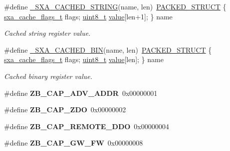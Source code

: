 \begin{DoxyCompactItemize}
\item 
\#define \hyperlink{group___s_x_a_ga43c6a2c7e1b5ee83edc039a248412580}{\+\_\+\+S\+X\+A\+\_\+\+C\+A\+C\+H\+E\+D\+\_\+\+S\+T\+R\+I\+NG}(name,  len)~\hyperlink{group___s_x_a_ga4233297bd31be5c273d4fb0758cc54d7}{P\+A\+C\+K\+E\+D\+\_\+\+S\+T\+R\+U\+CT} \{ \hyperlink{group___s_x_a_ga21b45e50d83fcc1363c4239313e88c06}{sxa\+\_\+cache\+\_\+flags\+\_\+t} flags; \hyperlink{group__hal__dos_gae1affc9ca37cfb624959c866a73f83c2}{uint8\+\_\+t} \hyperlink{group__zcl_ga1ed5b151a90f7e99af8cca2e6875ddf4}{value}\mbox{[}len+1\mbox{]}; \} name
\begin{DoxyCompactList}\small\item\em Cached string register value. \end{DoxyCompactList}\item 
\#define \hyperlink{group___s_x_a_gaa0c4e5507161ec6f607d737e4d949a0b}{\+\_\+\+S\+X\+A\+\_\+\+C\+A\+C\+H\+E\+D\+\_\+\+B\+IN}(name,  len)~\hyperlink{group___s_x_a_ga4233297bd31be5c273d4fb0758cc54d7}{P\+A\+C\+K\+E\+D\+\_\+\+S\+T\+R\+U\+CT} \{ \hyperlink{group___s_x_a_ga21b45e50d83fcc1363c4239313e88c06}{sxa\+\_\+cache\+\_\+flags\+\_\+t} flags; \hyperlink{group__hal__dos_gae1affc9ca37cfb624959c866a73f83c2}{uint8\+\_\+t} \hyperlink{group__zcl_ga1ed5b151a90f7e99af8cca2e6875ddf4}{value}\mbox{[}len\mbox{]}; \} name
\begin{DoxyCompactList}\small\item\em Cached binary register value. \end{DoxyCompactList}\item 
\mbox{\label{group___s_x_a_gaa7956981f26959da78a1394c2ad65c4d}} 
\#define {\bfseries Z\+B\+\_\+\+C\+A\+P\+\_\+\+A\+D\+V\+\_\+\+A\+D\+DR}~0x00000001
\item 
\mbox{\label{group___s_x_a_gaa2470002554608a36463a2f19ddf96f4}} 
\#define {\bfseries Z\+B\+\_\+\+C\+A\+P\+\_\+\+Z\+DO}~0x00000002
\item 
\mbox{\label{group___s_x_a_ga2c7a5cf548a644f0ffb85e45138f60f3}} 
\#define {\bfseries Z\+B\+\_\+\+C\+A\+P\+\_\+\+R\+E\+M\+O\+T\+E\+\_\+\+D\+DO}~0x00000004
\item 
\mbox{\label{group___s_x_a_gadf32af1981087015b41e8d701d8d2f10}} 
\#define {\bfseries Z\+B\+\_\+\+C\+A\+P\+\_\+\+G\+W\+\_\+\+FW}~0x00000008
\item 

\end{DoxyCompactItemize}
